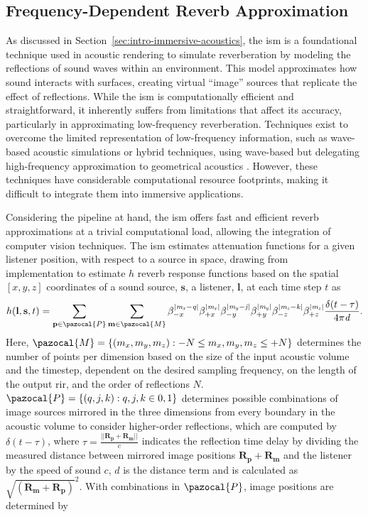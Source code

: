 \subsection{Frequency-Dependent Reverb Approximation}
As discussed in Section~\ref{sec:intro-immersive-acoustics}, the \acrfull{ism} is a foundational technique used in acoustic rendering to simulate reverberation by modeling the reflections of sound waves within an environment. This model approximates how sound interacts with surfaces, creating virtual ``image'' sources that replicate the effect of reflections. While the \acrshort{ism} is computationally efficient and straightforward, it inherently suffers from limitations that affect its accuracy, particularly in approximating low-frequency reverberation. Techniques exist to overcome the limited representation of low-frequency information, such as wave-based acoustic simulations \citep{hamilton2017fdtd} or hybrid techniques, using wave-based but delegating high-frequency approximation to geometrical acoustics \citep{southern2013room}. However, these techniques have considerable computational resource footprints, making it difficult to integrate them into immersive applications.\par
Considering the pipeline at hand, the \acrshort{ism} offers fast and efficient reverb approximations at a trivial computational load, allowing the integration of computer vision techniques. The \acrshort{ism} estimates attenuation functions for a given listener position, with respect to a source in space, drawing from~\cite{habets2006room} implementation to estimate $h$ reverb response functions based on the spatial $[x, y, z]$ coordinates of a sound source, $\mathbf{s}$, a listener, $\mathbf{l}$, at each time step $t$ as 
\begin{equation}\label{eq:ism-base}
    h(\mathbf{l}, \mathbf{s}, t) = \sum_{\mathbf{p} \in \pazocal{P}} \sum_{\mathbf{m} \in \pazocal{M}} \beta_{-x}^{|\mathit{m_x - q}|} \beta_{+x}^{|\mathit{m_x}|} \beta_{-y}^{|\mathit{m_y - j}|} \beta_{+y}^{|\mathit{m_y}|} \beta_{-z}^{|\mathit{m_z - k}|}  \beta_{+z}^{|\mathit{m_z}|} \frac{\delta(t - \tau)}{4\pi \mathit{d}}\textrm{.}
\end{equation}
Here, $\pazocal{M} = \{(m_x, m_y, m_z): -N \leq m_x, m_y, m_z \leq +N\}$ determines the number of points per dimension based on the size of the input acoustic volume and the timestep, dependent on the desired sampling frequency, on the length of the output \acrshort{rir}, and the order of reflections $N$. $\pazocal{P} = \{ (q, j, k): q, j, k \in {0, 1} \}$ determines possible combinations of image sources mirrored in the three dimensions from every boundary in the acoustic volume to consider higher-order reflections, which are computed by $\delta (t - \tau)$, where $\tau = \frac{||\mathbf{R_p} + \mathbf{R_m}||}{c}$ indicates the reflection time delay by dividing the measured distance between mirrored image positions $\mathbf{R_p} + \mathbf{R_m}$ and the listener by the speed of sound $c$, $d$ is the distance term and is calculated as $\sqrt{(\mathbf{R_m}+\mathbf{R_p})}^2$. With combinations in $\pazocal{P}$, image positions are determined by
